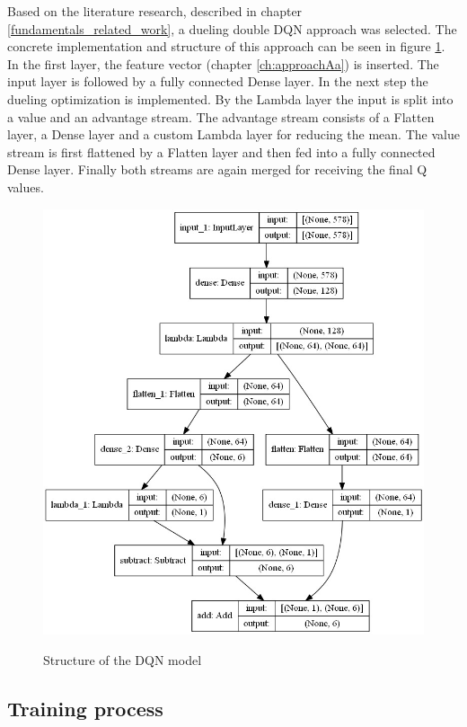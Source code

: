 Based on the literature research, described in chapter \ref{fundamentals_related_work}, a dueling double DQN approach was selected. The concrete implementation and structure of this approach can be seen in figure \ref{fig:model}.
In the first layer, the feature vector (chapter \ref{ch:approachAa}) is inserted. The input layer is followed by a fully connected Dense layer. In the next step the dueling optimization is implemented. By the Lambda layer the input is split into a value and an advantage stream. 
The advantage stream consists of a Flatten layer, a Dense layer and a custom Lambda layer for reducing the mean.
The value stream is first flattened by a Flatten layer and then fed into a fully connected Dense layer.
Finally both streams are again merged for receiving the final Q values.

\begin{figure}[ht]
	\centering
	\includegraphics[width=0.8\linewidth]{figures/model.jpeg}
	\caption{Structure of the DQN model}
	\label{fig:model}
	\cite{own representation}
\end{figure}

\subsection{Training process} 
\label{ch:approachB}



